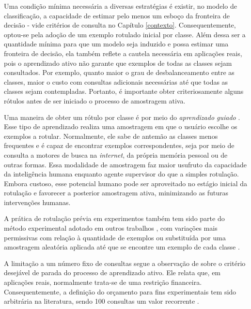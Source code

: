 Uma condição mínima necessária a diversas estratégias é existir, no modelo de classificação, a capacidade de estimar pelo menos um esboço da fronteira de decisão - vide critérios de consulta no Capítulo \ref{contexto}.
Consequentemente, optou-se pela adoção de um exemplo rotulado inicial por classe.
Além dessa ser a quantidade mínima para que um modelo seja induzido e possa estimar uma fronteira de decisão, ela também reflete a cautela necessária em aplicações reais, pois o aprendizado ativo não garante que exemplos de todas as classes sejam consultados.
Por exemplo, quanto maior o grau de desbalanceamento entre as classes, maior o custo com consultas adicionais necessárias até que todas as classes sejam contempladas.
Portanto, é importante obter criteriosamente alguns rótulos antes de ser iniciado o processo de amostragem ativa.

Uma maneira de obter um rótulo por classe é por meio do \textit{aprendizado guiado} \cite{conf/kdd/AttenbergP10}.
Esse tipo de aprendizado realiza uma amostragem em que o usuário escolhe os exemplos a rotular.
Normalmente, ele sabe de antemão as classes menos frequentes e é capaz de encontrar exemplos correspondentes, seja por meio de consulta a motores de busca na \textit{internet}, da própria memória pessoal ou de outras formas.
Essa modalidade de amostragem faz maior usufruto da capacidade da inteligência humana enquanto agente supervisor do que a simples rotulação.
Embora custoso, esse potencial humano pode ser aproveitado no estágio inicial da rotulação e favorecer a posterior amostragem ativa, minimizando as futuras intervenções humanas.

A prática de rotulação prévia em experimentos também tem sido parte do método experimental adotado em outros trabalhos \cite{conf/nips/GuoS07, conf/cvpr/BiswasP13, conf/iconip/GuJC14a}, com variações mais permissivas com relação à quantidade de exemplos \cite{journals/prl/PatraB12} ou substituída por uma amostragem aleatória aplicada até que se encontre um exemplo de cada classe \cite{chermanaprendizado}.

A limitação a um número fixo de consultas segue a observação de  sobre o critério desejável de parada do processo de aprendizado ativo. 
Ele relata que, em aplicações reais, normalmente trata-se de uma restrição financeira.
Consequentemente, a definição do orçamento para fins experimentais tem sido arbitrária na literatura, sendo 100 consultas um valor recorrente \cite{journals/pieee/CrawfordTY13,chermanaprendizado,conf/nips/SettlesCR07,conf/icml/RoyM01,conf/emnlp/SettlesC08}.
 
